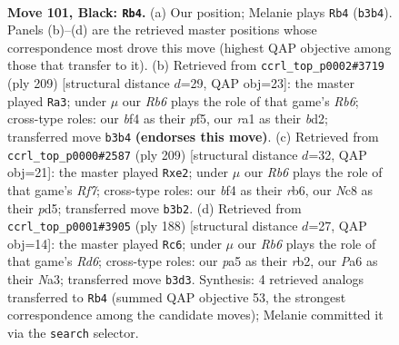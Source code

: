 \documentclass[11pt]{article}
\begin{document}
\clearpage

\begin{figure}[p]\centering
\begin{subfigure}{0.46\textwidth}\centering
\resizebox{\linewidth}{!}{%
\newchessgame
\chessboard[
  setfen={2n4K/8/p3k3/P4p1p/5B2/Nr4P1/6b1/R7 b - - 13 101},
  showmover=false,
  pgfstyle=straightmove, color=movearrow, markmove={b3-b4}
]}
\caption{}
\end{subfigure}\hfill
\begin{subfigure}{0.46\textwidth}\centering
\resizebox{\linewidth}{!}{%
\newchessgame
\chessboard[
  setfen={8/6k1/5p2/4pP2/2p3P1/1rN5/3B1K2/8 b - - 65 105},
  showmover=false,
  pgfstyle=straightmove, color=movearrow, markmove={b3-a3}
]}
\caption{}
\end{subfigure}
\\[4pt]
\begin{subfigure}{0.46\textwidth}\centering
\resizebox{\linewidth}{!}{%
\newchessgame
\chessboard[
  setfen={8/6k1/1R1p3p/3P1p2/2K2P1P/4p3/4Br2/8 b - - 0 105},
  showmover=false,
  pgfstyle=straightmove, color=movearrow, markmove={f2-e2}
]}
\caption{}
\end{subfigure}\hfill
\begin{subfigure}{0.46\textwidth}\centering
\resizebox{\linewidth}{!}{%
\newchessgame
\chessboard[
  setfen={8/4k3/3Rb2p/5p2/7P/N3PPK1/1r6/8 w - - 27 95},
  showmover=false,
  pgfstyle=straightmove, color=movearrow, markmove={d6-c6}
]}
\caption{}
\end{subfigure}
\caption{\textbf{Move 101, Black: \texttt{Rb4}.} (a) Our position; Melanie plays \texttt{Rb4} (\texttt{b3b4}). Panels (b)--(d) are the retrieved master positions whose correspondence most drove this move (highest QAP objective among those that transfer to it). (b) Retrieved from \texttt{ccrl\_top\_p0002\#3719} (ply 209) [structural distance $d$=29, QAP obj=23]: the master played \texttt{Ra3}; under $\mu$ our \emph{Rb6} plays the role of that game's \emph{Rb6}; cross-type roles: our \emph{b}f4 as their \emph{p}f5, our \emph{r}a1 as their \emph{b}d2; transferred move \texttt{b3b4} \textbf{(endorses this move)}. (c) Retrieved from \texttt{ccrl\_top\_p0000\#2587} (ply 209) [structural distance $d$=32, QAP obj=21]: the master played \texttt{Rxe2}; under $\mu$ our \emph{Rb6} plays the role of that game's \emph{Rf7}; cross-type roles: our \emph{b}f4 as their \emph{r}b6, our \emph{N}c8 as their \emph{p}d5; transferred move \texttt{b3b2}. (d) Retrieved from \texttt{ccrl\_top\_p0001\#3905} (ply 188) [structural distance $d$=27, QAP obj=14]: the master played \texttt{Rc6}; under $\mu$ our \emph{Rb6} plays the role of that game's \emph{Rd6}; cross-type roles: our \emph{p}a5 as their \emph{r}b2, our \emph{P}a6 as their \emph{N}a3; transferred move \texttt{b3d3}. Synthesis: 4 retrieved analogs transferred to \texttt{Rb4} (summed QAP objective 53, the strongest correspondence among the candidate moves); Melanie committed it via the \texttt{search} selector.}
\label{fig:thought-m201}
\end{figure}
\end{document}

